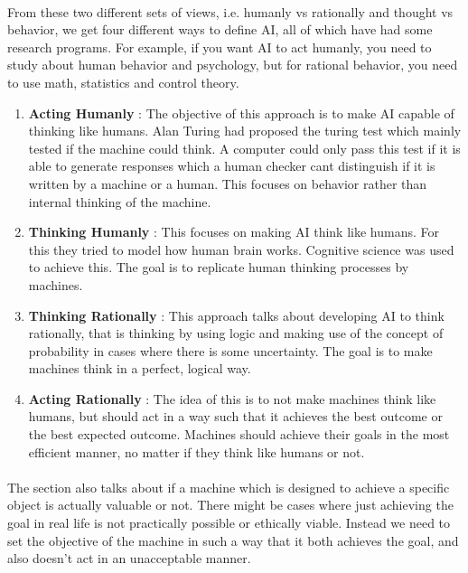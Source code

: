 \documentclass{article}
\begin{document}
\paragraph{}
	From these two different sets of views, i.e. humanly vs rationally and thought vs behavior, we get four different ways to define AI, all of which have had some research programs.
	For example, if you want AI to act humanly, you need to study about human behavior and psychology, but for rational behavior, you need to use math, statistics and control theory. 


\begin{enumerate}
	\item \textbf{Acting Humanly} : The objective of this approach is to make AI capable of thinking like humans. Alan Turing had proposed the turing test which mainly tested if the machine could think. A computer could only pass this test if it is able to generate responses which a human checker cant distinguish if it is written by a machine or a human. This focuses on behavior rather than internal thinking of the machine.
	\item \textbf{Thinking Humanly} : This focuses on making AI think like humans. For this they tried to model how human brain works. Cognitive science was used to achieve this. The goal is to replicate human thinking processes by machines.
	\item \textbf{Thinking Rationally} : This approach talks about developing AI to think rationally, that is thinking by using logic and making use of the concept of probability in cases where there is some uncertainty. The goal is to make machines think in a perfect, logical way.

	\item \textbf{Acting Rationally} : The idea of this is to not make machines think like humans, but should act in a way such that it achieves the best outcome or the best expected outcome. Machines should achieve their goals in the most efficient manner, no matter if they think like humans or not. 
\end{enumerate}

\paragraph{}
	The section also talks about if a machine which is designed to achieve a specific object is actually valuable or not.
	There might be cases where just achieving the goal in real life is not practically possible or ethically viable.
	Instead we need to set the objective of the machine in such a way that it both achieves the goal, and also doesn’t act in an unacceptable manner.
\end{document}
